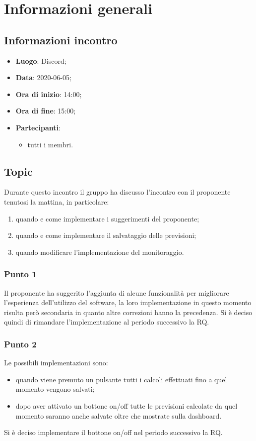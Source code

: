\section{Informazioni generali}
\subsection{Informazioni incontro}
\begin{itemize}
\item \textbf{Luogo}: Discord;
\item \textbf{Data}: 2020-06-05;
\item \textbf{Ora di inizio}: 14:00;
\item \textbf{Ora di fine}: 15:00;
\item \textbf{Partecipanti}:
	\begin{itemize}
		\item tutti i membri.
	\end{itemize}
\end{itemize}

\subsection{Topic}
Durante questo incontro il gruppo ha discusso l'incontro con il proponente tenutosi la mattina, in particolare:
\begin{enumerate}
	\item quando e come implementare i suggerimenti del proponente;
	\item quando e come implementare il salvataggio delle previsioni;
	\item quando modificare l'implementazione del monitoraggio.
\end{enumerate}

\subsubsection{Punto 1}
Il proponente ha suggerito l'aggiunta di alcune funzionalità per migliorare l'esperienza dell'utilizzo del software, la loro implementazione in questo momento risulta però secondaria in quanto altre correzioni hanno la precedenza. Si è deciso quindi di rimandare l'implementazione al periodo successivo la RQ.

\subsubsection{Punto 2}
Le possibili implementazioni sono:
\begin{itemize}
\item quando viene premuto un pulsante tutti i calcoli effettuati fino a quel momento vengono salvati;
\item dopo aver attivato un bottone on/off tutte le previsioni calcolate da quel momento saranno anche salvate oltre che mostrate sulla dashboard.
\end{itemize}
Si è deciso implementare il bottone on/off nel periodo successivo la RQ.

